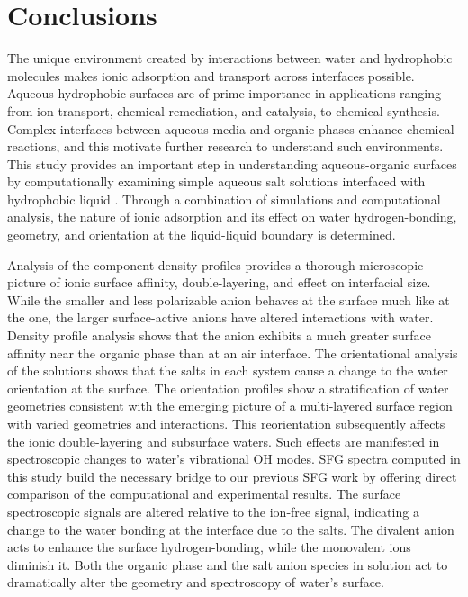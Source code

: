 \section{Conclusions}

The unique environment created by interactions between water and hydrophobic molecules makes ionic adsorption and transport across interfaces possible. Aqueous-hydrophobic surfaces are of prime importance in applications ranging from ion transport, chemical remediation, and catalysis, to chemical synthesis. Complex interfaces between aqueous media and organic phases enhance chemical reactions, and this motivate further research to understand such environments. This study provides an important step in understanding aqueous-organic surfaces by computationally examining simple aqueous salt solutions interfaced with hydrophobic liquid \ctc. Through a combination of simulations and computational analysis, the nature of ionic adsorption and its effect on water hydrogen-bonding, geometry, and orientation at the liquid-liquid boundary is determined.

Analysis of the component density profiles provides a thorough microscopic picture of ionic surface affinity, double-layering, and effect on interfacial size. While the smaller and less polarizable \cl anion behaves at the \ctcwat surface much like at the \airwat one, the larger surface-active anions have altered interactions with water. Density profile analysis shows that the \nit anion exhibits a much greater surface affinity near the organic phase than at an air interface. The orientational analysis of the solutions shows that the salts in each system cause a change to the water orientation at the \ctcwat surface. The orientation profiles show a stratification of water geometries consistent with the emerging picture of a multi-layered surface region with varied geometries and interactions. This reorientation subsequently affects the ionic double-layering and subsurface waters. Such effects are manifested in spectroscopic changes to water's vibrational OH modes. SFG spectra computed in this study build the necessary bridge to our previous SFG work by offering direct comparison of the computational and experimental results. The surface spectroscopic signals are altered relative to the ion-free signal, indicating a change to the water bonding at the interface due to the salts. The divalent \sul anion acts to enhance the surface hydrogen-bonding, while the monovalent ions diminish it. Both the organic phase and the salt anion species in solution act to dramatically alter the geometry and spectroscopy of water's surface. 

